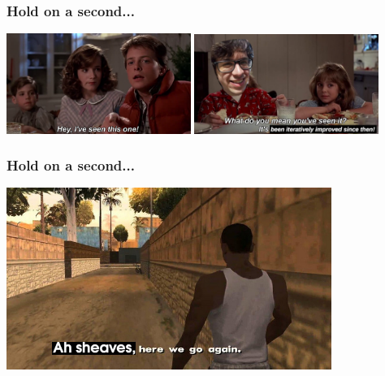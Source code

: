 \begin{frame}
    \frametitle{Hold on a second...}
    \centering

    \await

    \includegraphics[width=0.45\textwidth]{imgs/before}
    \await
    \includegraphics[width=0.45\textwidth]{imgs/improved}

\end{frame}

\begin{frame}
    \frametitle{Hold on a second...}

    \centering

    \includegraphics[height=16em]{imgs/sheaves}

\end{frame}